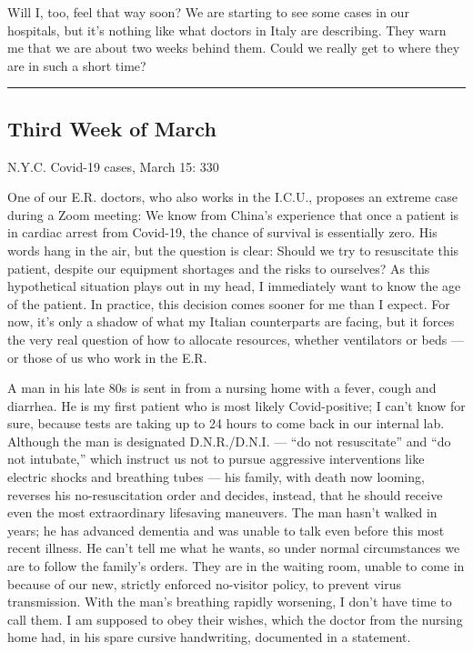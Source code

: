 Will I, too, feel that way soon? We are starting to see some cases in
our hospitals, but it's nothing like what doctors in Italy are
describing. They warn me that we are about two weeks behind them. Could
we really get to where they are in such a short time?

\begin{center}\rule{0.5\linewidth}{\linethickness}\end{center}

\hypertarget{third-week-of-march}{%
\subsection{Third Week of March}\label{third-week-of-march}}

N.Y.C. Covid-19 cases, March 15: 330

One of our E.R. doctors, who also works in the I.C.U., proposes an
extreme case during a Zoom meeting: We know from China's experience that
once a patient is in cardiac arrest from ­Covid-19, the chance of
survival is essentially zero. His words hang in the air, but the
question is clear: Should we try to resuscitate this patient, despite
our equipment shortages and the risks to ourselves? As this hypothetical
situation plays out in my head, I immediately want to know the age of
the patient. In practice, this decision comes sooner for me than I
expect. For now, it's only a shadow of what my Italian counterparts are
facing, but it forces the very real question of how to allocate
resources, whether ventilators or beds --- or those of us who work in
the E.R.

A man in his late 80s is sent in from a nursing home with a fever, cough
and diarrhea. He is my first patient who is most likely Covid-positive;
I can't know for sure, because tests are taking up to 24 hours to come
back in our internal lab. Although the man is designated D.N.R./D.N.I.
--- ``do not resuscitate'' and ``do not intubate,'' which instruct us
not to pursue aggressive interventions like electric shocks and
breathing tubes --- his family, with death now looming, reverses his
no-resuscitation order and decides, instead, that he should receive even
the most extraordinary lifesaving maneuvers. The man hasn't walked in
years; he has advanced dementia and was unable to talk even before this
most recent illness. He can't tell me what he wants, so under normal
circumstances we are to follow the family's orders. They are in the
waiting room, unable to come in because of our new, strictly enforced
no-visitor policy, to prevent virus transmission. With the man's
breathing rapidly worsening, I don't have time to call them. I am
supposed to obey their wishes, which the doctor from the nursing home
had, in his spare cursive handwriting, documented in a statement.

